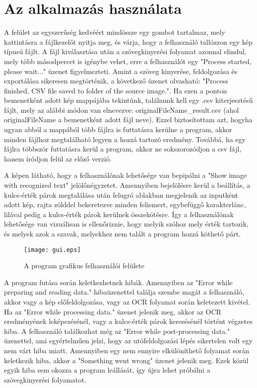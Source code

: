 \documentclass[12pt]{report}
\begin{document}
\section{Az alkalmazás használata}
A felület az egyszerűség kedvéért mindössze egy gombot tartalmaz, mely kattintásra a fájlkezelőt nyitja meg, és várja, hogy a felhasználó tallózzon egy kép típusú fájlt. A fájl kiválasztása után a szövegkinyerési folyamat azonnal elindul, mely több másodpercet is igénybe vehet, erre a felhasználót egy "Process started, please wait..." üzenet figyelmezteti. Amint a szöveg kinyerése, feldolgozása és exportálása sikeresen megtörténik, a következő üzenet olvasható: "Process finished, CSV file saved to folder of the source image.".
Ha ezen a ponton bemenetként adott kép mappájába tekintünk, találnunk kell egy .csv kiterjesztésű fájlt, mely az alábbi módon van elnevezve: originalFileName\_result.csv (ahol originalFileName a bemenetként adott fájl neve). Ezzel biztosítottam azt, hogyha ugyan abból a mappából több fájlra is futtatásra kerülne a program, akkor minden fájlhoz megtalálható legyen a hozzá tartozó eredmény. Továbbá, ha egy fájlra többször futtatásra kerül a program, akkor ne sokszorozódjon a csv fájl, hanem íródjon felül az előző verzió.

A képen látható, hogy a felhasználónak lehetősége van bepipálni a "Show image with recognized text" jelölőnégyzetet. Amennyiben bejelölésre kerül a beállítás, a kulcs-érték párok megtalálása után felugró ablakban megjelenik az inputként adott kép, rajta zölddel bekeretezve minden felismert, egybefüggő karakterlánc, lilával pedig a kulcs-érték párok kerülnek összekötésre.
Így a felhasználónak lehetősége van vizuálisan is ellenőriznie, hogy melyik szóhoz mely érték tartozik, és melyek azok a szavak, melyekhez nem talált a program hozzá köthető párt.

\begin{figure}[h]
    \centerline{\texttt{[image: gui.eps]}}
    \caption{A program grafikus felhasználói felülete}
\end{figure}

A program futása során keletkezhetnek hibák. Amennyiben az "Error while preparing and reading data." hibaüzenettel találja szembe magát a felhasználó, akkor vagy a kép előfeldolgozása, vagy az OCR folyamat során keletezett kivétel. Ha az "Error while processing data." üzenet jelenik meg, akkor az OCR eredményének leképezésénél, vagy a kulcs-érték párok keresésénél történt végzetes hiba.
A felhasználó találkozhat még az "Error while post-processing data." üzenettel, ami egyértelműen jelzi, hogy az utófeldolgozási lépés sikertelen volt egy nem várt hiba miatt. Amennyiben egy nem ennyire elkülöníthető folyamat során keletkezik hiba, akkor a "Something went wrong" üzenet jelenik meg. Ezek közül egyik hiba sem okozza a program leállását, így újra lehet próbálni a szövegkinyerési folyamatot.
\end{document}
